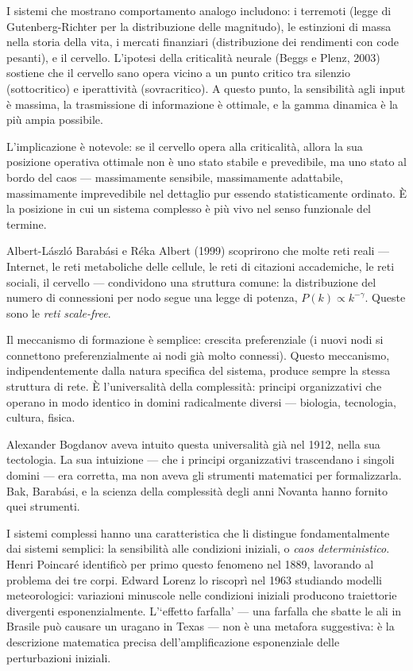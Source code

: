 \documentclass[12pt,a4paper,openany]{book}
\newcommand{\sezione}[1]{\vspace{1.2em}{\large\bfseries #1}\vspace{0.5em}\par}
\begin{document}
I sistemi che mostrano comportamento analogo includono: i terremoti (legge di Gutenberg-Richter per la distribuzione delle magnitudo), le estinzioni di massa nella storia della vita, i mercati finanziari (distribuzione dei rendimenti con code pesanti), e il cervello. L'ipotesi della criticalità neurale (Beggs e Plenz, 2003) sostiene che il cervello sano opera vicino a un punto critico tra silenzio (sottocritico) e iperattività (sovracritico). A questo punto, la sensibilità agli input è massima, la trasmissione di informazione è ottimale, e la gamma dinamica è la più ampia possibile.

L'implicazione è notevole: se il cervello opera alla criticalità, allora la sua posizione operativa ottimale non è uno stato stabile e prevedibile, ma uno stato al bordo del caos — massimamente sensibile, massimamente adattabile, massimamente imprevedibile nel dettaglio pur essendo statisticamente ordinato. È la posizione in cui un sistema complesso è più vivo nel senso funzionale del termine.

\sezione{Reti scale-free e l'universalità dell'organizzazione}

Albert-László Barabási e Réka Albert (1999) scoprirono che molte reti reali — Internet, le reti metaboliche delle cellule, le reti di citazioni accademiche, le reti sociali, il cervello — condividono una struttura comune: la distribuzione del numero di connessioni per nodo segue una legge di potenza, $P(k) \propto k^{-\gamma}$. Queste sono le \textit{reti scale-free}.

Il meccanismo di formazione è semplice: crescita preferenziale (i nuovi nodi si connettono preferenzialmente ai nodi già molto connessi). Questo meccanismo, indipendentemente dalla natura specifica del sistema, produce sempre la stessa struttura di rete. È l'universalità della complessità: principi organizzativi che operano in modo identico in domini radicalmente diversi — biologia, tecnologia, cultura, fisica.

Alexander Bogdanov aveva intuito questa universalità già nel 1912, nella sua tectologia. La sua intuizione — che i principi organizzativi trascendano i singoli domini — era corretta, ma non aveva gli strumenti matematici per formalizzarla. Bak, Barabási, e la scienza della complessità degli anni Novanta hanno fornito quei strumenti.

\sezione{I limiti della predizione: il caos deterministico}

I sistemi complessi hanno una caratteristica che li distingue fondamentalmente dai sistemi semplici: la sensibilità alle condizioni iniziali, o \textit{caos deterministico}. Henri Poincaré identificò per primo questo fenomeno nel 1889, lavorando al problema dei tre corpi. Edward Lorenz lo riscoprì nel 1963 studiando modelli meteorologici: variazioni minuscole nelle condizioni iniziali producono traiettorie divergenti esponenzialmente. L'`effetto farfalla' — una farfalla che sbatte le ali in Brasile può causare un uragano in Texas — non è una metafora suggestiva: è la descrizione matematica precisa dell'amplificazione esponenziale delle perturbazioni iniziali.
\end{document}
